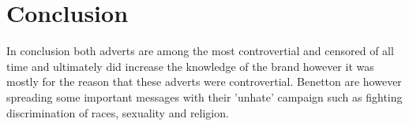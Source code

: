 \documentclass[11pt]{article}
\begin{document}
\section{Conclusion}
\label{sec:org6361c4b}
In conclusion both adverts are among the most controvertial and censored of all time and ultimately did increase the knowledge of the brand however it was mostly for the reason that these adverts were controvertial. Benetton are however spreading some important messages with their 'unhate' campaign such as fighting discrimination of races, sexuality and religion.
\end{document}
